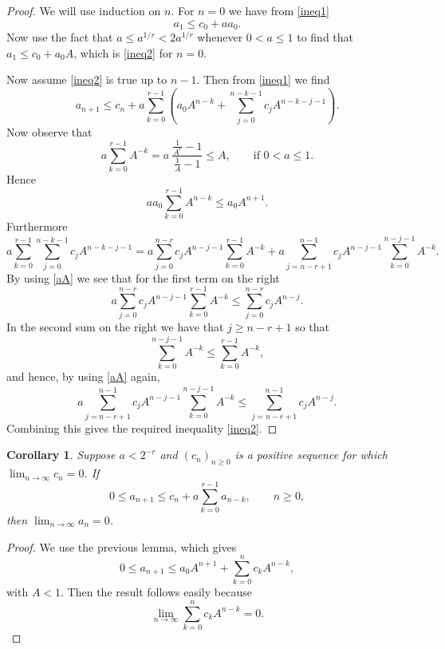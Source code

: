 \documentclass[12pt]{article}
\newtheorem{corollary}[proposition]{Corollary}
\numberwithin{equation}{section}
\begin{document}
\begin{proof}
We will use induction on $n$. For $n=0$ we have from \eqref{ineq1}
\[    a_1 \leq c_0 + a a_0.  \]
Now use the fact that $a \leq a^{1/r} < 2a^{1/r}$ whenever $0 < a \leq 1$ to find that $a_1 \leq c_0+ a_0 A$, which is \eqref{ineq2} for $n=0$.

Now assume \eqref{ineq2} is true up to $n-1$. Then from \eqref{ineq1} we find
\[     a_{n+1} \leq  c_n + a \sum_{k=0}^{r-1} \left(  a_0 A^{n-k} + \sum_{j=0}^{n-k-1} c_j A^{n-k-j-1} \right).  \]
Now observe that %
\begin{equation}  \label{aA}
       a \sum_{k=0}^{r-1} A^{-k} = a\  \frac{\frac{1}{A^r}-1}{\frac{1}{A}-1} \leq A, \qquad  \textrm{if } 0 < a \leq 1. 
\end{equation}
Hence
\[    a  a_0  \sum_{k=0}^{r-1} A^{n-k} \leq a_0 A^{n+1}. \]
Furthermore
\[     a \sum_{k=0}^{r-1} \sum_{j=0}^{n-k-1} c_j A^{n-k-j-1}  = a \sum_{j=0}^{n-r} c_j A^{n-j-1}  \sum_{k=0}^{r-1} A^{-k} 
+ a \sum_{j=n-r+1}^{n-1} c_j A^{n-j-1} \sum_{k=0}^{n-j-1} A^{-k} .  \]
By using \eqref{aA} we see that for the first term on the right
\[   a \sum_{j=0}^{n-r} c_j A^{n-j-1}  \sum_{k=0}^{r-1} A^{-k} \leq  \sum_{j=0}^{n-r} c_j A^{n-j}.  \]
In the second sum on the right we have that $j \geq n-r+1$ so that
\[        \sum_{k=0}^{n-j-1} A^{-k} \leq  \sum_{k=0}^{r-1} A^{-k}, \]  
and hence, by using \eqref{aA} again,
\[     a \sum_{j=n-r+1}^{n-1} c_j A^{n-j-1} \sum_{k=0}^{n-j-1} A^{-k} \leq  \sum_{j=n-r+1}^{n-1}  c_j A^{n-j}.  \]
Combining this gives the required inequality \eqref{ineq2}.
\end{proof}

\begin{corollary}\label{cor:aux1}
Suppose $a < 2^{-r}$ and $(c_n)_{n \geq 0}$ is a positive sequence for which $\lim_{n \to \infty} c_n = 0$. If
\[    0 \leq  a_{n+1} \leq c_n + a \sum_{k=0}^{r-1} a_{n-k}, \qquad  n \geq 0,  \]
then $\lim_{n \to \infty} a_n= 0$.  
\end{corollary}

\begin{proof}
We use the previous lemma, which gives
\[   0 \leq a_{n+1} \leq a_0 A^{n+1} + \sum_{k=0}^n c_k A^{n-k} ,  \]
with $A < 1$. Then the result follows easily because
\[   \lim_{n \to \infty} \sum_{k=0}^n c_k A^{n-k} = 0 .  \]
\end{proof}
\end{document}
